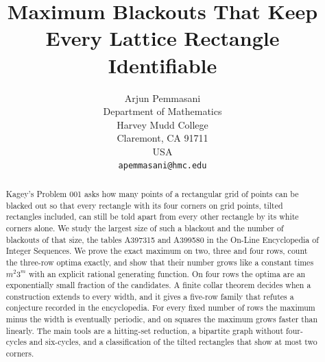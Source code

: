\documentclass[12pt]{article}
\title{Maximum Blackouts That Keep Every Lattice Rectangle Identifiable}
\author{Arjun Pemmasani\\
Department of Mathematics\\
Harvey Mudd College\\
Claremont, CA 91711\\
USA\\
\texttt{apemmasani@hmc.edu}}
\date{}
\theoremstyle{plain}
\theoremstyle{definition}
\theoremstyle{remark}
\begin{document}
\maketitle

\begin{abstract}
Kagey's Problem 001 asks how many points of a rectangular grid of points can be
blacked out so that every rectangle with its four corners on grid points, tilted
rectangles included, can still be told apart from every other rectangle by its white
corners alone. We study the largest size of such a blackout and the number of
blackouts of that size, the tables A397315 and A399580 in the On-Line Encyclopedia
of Integer Sequences. We prove the exact maximum on two, three and four rows, count
the three-row optima exactly, and show that their number grows like a constant times
$m^2 3^m$ with an explicit rational generating function. On four rows
the optima are an exponentially small fraction of the candidates. A finite collar
theorem decides when a construction extends to every width, and it gives a five-row
family that refutes a conjecture recorded in the encyclopedia. For every fixed number
of rows the maximum minus the width is eventually periodic, and on squares the
maximum grows faster than linearly. The main tools are a hitting-set reduction, a
bipartite graph without four-cycles and six-cycles, and a classification of the tilted
rectangles that show at most two corners.
\end{abstract}













\appendix



\end{document}
